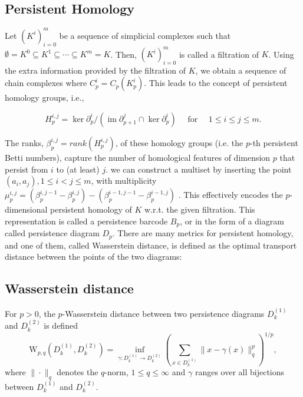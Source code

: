 \documentclass[letterpaper]{article} %
\begin{document}
\subsection{Persistent Homology}
Let $\left(K^i\right)_{i=0}^m$ be a sequence of simplicial complexes such that $\emptyset=K^0 \subseteq K^1 \subseteq \cdots \subseteq K^m=K$. Then, $\left(K^i\right)_{i=0}^m$ is called a filtration of $K$. Using the extra information provided by the filtration of $K$, we obtain a sequence of chain complexes where $C_p^i=C_p\left(K_p^i\right)$. This leads to the concept of persistent homology groups, i.e.,

$$
H_p^{i, j}=\operatorname{ker} \partial_p^i /\left(\operatorname{im} \partial_{p+1}^j \cap \operatorname{ker} \partial_p^i\right) \quad \text { for } \quad 1 \leq i \leq j \leq m .
$$

The ranks, $\beta_p^{i, j} = rank(H_p^{i, j})$, of these homology groups (i.e. the $p$-th persistent Betti numbers), capture the number of homological features of dimension $p$ that persist from $i$ to (at least) $j$. we can construct a multiset by inserting the point $(a_i , a_j ), 1 \leq i < j \leq m$, with multiplicity $\mu_p^{i, j}=\left(\beta_p^{i, j-1}-\beta_p^{i, j}\right)-\left(\beta_p^{i-1, j-1}-\beta_p^{i-1, j}\right)$ . This effectively encodes the $p$-dimensional persistent homology of $K$ w.r.t. the given filtration. This representation is called a persistence barcode $B_p$, or in the form of a diagram called persistence diagram $D_p$. There are many metrics for  persistent homology, and one of them, called Wasserstein distance, is defined as the optimal transport distance between the points of the two diagrams:
\subsection{Wasserstein distance}
    For $p>0$, the $p$-Wasserstein distance between two persistence diagrams $D_k^{(1)}$ and $D_k^{(2)}$ is defined
$$
\mathrm{W}_{p, q}\left(D_k^{(1)}, D_k^{(2)}\right)=\inf _{\gamma: D_k^{(1)} \rightarrow D_k^{(2)}}\left(\sum_{x \in D_k^{(1)}}\|x-\gamma(x)\|_q^p\right)^{1 / p},
$$
    where $\|\cdot\|_q$ denotes the $q$-norm, $1 \leq q \leq \infty$ and $\gamma$ ranges over all bijections between $D_k^{(1)}$ and $D_k^{(2)}$. 
\end{document}
